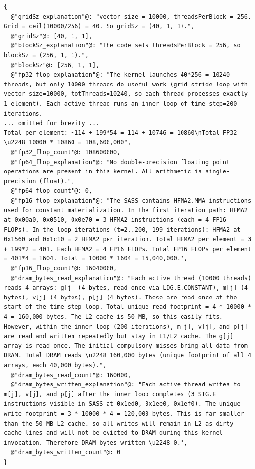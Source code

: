 \begin{lstlisting}[style=appendixjson,caption={Example expected LLM tool-call response in JSON output format (compacted for appendix display).},label={lst:appendix-json-output}]
{
  @"gridSz_explanation"@: "vector_size = 10000, threadsPerBlock = 256. Grid = ceil(10000/256) = 40. So gridSz = (40, 1, 1).",
  @"gridSz"@: [40, 1, 1],
  @"blockSz_explanation"@: "The code sets threadsPerBlock = 256, so blockSz = (256, 1, 1).",
  @"blockSz"@: [256, 1, 1],
  @"fp32_flop_explanation"@: "The kernel launches 40*256 = 10240 threads, but only 10000 threads do useful work (grid-stride loop with vector_size=10000, totThreads=10240, so each thread processes exactly 1 element). Each active thread runs an inner loop of time_step=200 iterations. 
... omitted for brevity ...
Total per element: ~114 + 199*54 = 114 + 10746 = 10860\nTotal FP32 \u2248 10000 * 10860 = 108,600,000",
  @"fp32_flop_count"@: 108600000,
  @"fp64_flop_explanation"@: "No double-precision floating point operations are present in this kernel. All arithmetic is single-precision (float).",
  @"fp64_flop_count"@: 0,
  @"fp16_flop_explanation"@: "The SASS contains HFMA2.MMA instructions used for constant materialization. In the first iteration path: HFMA2 at 0x00a0, 0x0510, 0x0e70 = 3 HFMA2 instructions (each = 4 FP16 FLOPs). In the loop iterations (t=2..200, 199 iterations): HFMA2 at 0x1560 and 0x1c10 = 2 HFMA2 per iteration. Total HFMA2 per element = 3 + 199*2 = 401. Each HFMA2 = 4 FP16 FLOPs. Total FP16 FLOPs per element = 401*4 = 1604. Total = 10000 * 1604 = 16,040,000.",
  @"fp16_flop_count"@: 16040000,
  @"dram_bytes_read_explanation"@: "Each active thread (10000 threads) reads 4 arrays: g[j] (4 bytes, read once via LDG.E.CONSTANT), m[j] (4 bytes), v[j] (4 bytes), p[j] (4 bytes). These are read once at the start of the time_step loop. Total unique read footprint = 4 * 10000 * 4 = 160,000 bytes. The L2 cache is 50 MB, so this easily fits. However, within the inner loop (200 iterations), m[j], v[j], and p[j] are read and written repeatedly but stay in L1/L2 cache. The g[j] array is read once. The initial compulsory misses bring all data from DRAM. Total DRAM reads \u2248 160,000 bytes (unique footprint of all 4 arrays, each 40,000 bytes).",
  @"dram_bytes_read_count"@: 160000,
  @"dram_bytes_written_explanation"@: "Each active thread writes to m[j], v[j], and p[j] after the inner loop completes (3 STG.E instructions visible in SASS at 0x1ed0, 0x1ee0, 0x1ef0). The unique write footprint = 3 * 10000 * 4 = 120,000 bytes. This is far smaller than the 50 MB L2 cache, so all writes will remain in L2 as dirty cache lines and will not be evicted to DRAM during this kernel invocation. Therefore DRAM bytes written \u2248 0.",
  @"dram_bytes_written_count"@: 0
}
\end{lstlisting}

